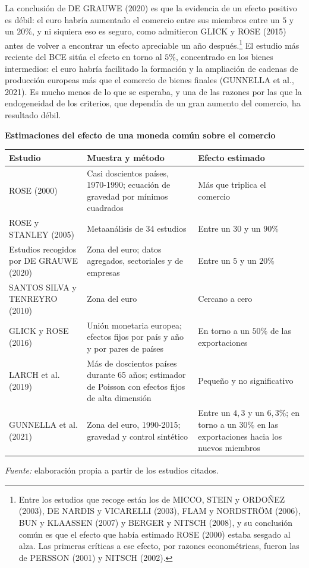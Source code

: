 \documentclass[10pt,a4paper]{article}
\begin{document}
La conclusión de DE GRAUWE (2020) es que la evidencia de un efecto positivo es débil: el euro habría aumentado el comercio entre sus miembros entre un $5$ y un $20\%$, y ni siquiera eso es seguro, como admitieron GLICK y ROSE (2015) antes de volver a encontrar un efecto apreciable un año después.\footnote{%
    Entre los estudios que recoge están los de MICCO, STEIN y ORDOÑEZ (2003), DE NARDIS y VICARELLI (2003), FLAM y NORDSTRÖM (2006), BUN y KLAASSEN (2007) y BERGER y NITSCH (2008), y su conclusión común es que el efecto que había estimado ROSE (2000) estaba sesgado al alza. Las primeras críticas a ese efecto, por razones econométricas, fueron las de PERSSON (2001) y NITSCH (2002).
} El estudio más reciente del BCE sitúa el efecto en torno al $5\%$, concentrado en los bienes intermedios: el euro habría facilitado la formación y la ampliación de cadenas de producción europeas más que el comercio de bienes finales (GUNNELLA et al., 2021). Es mucho menos de lo que se esperaba, y una de las razones por las que la endogeneidad de los criterios, que dependía de un gran aumento del comercio, ha resultado débil.

\begin{center}\begin{minipage}{\linewidth}\centering
{\small\textbf{Estimaciones del efecto de una moneda común sobre el comercio}}\par\vspace{0.3em}
{\footnotesize
\begin{tabular}{p{3.6cm}p{5.6cm}p{4.4cm}}
\hline
\textbf{Estudio} & \textbf{Muestra y método} & \textbf{Efecto estimado}\tabularnewline
\hline
ROSE (2000) & Casi doscientos países, 1970-1990; ecuación de gravedad por mínimos cuadrados & Más que triplica el comercio\tabularnewline
ROSE y STANLEY (2005) & Metaanálisis de 34 estudios & Entre un $30$ y un $90\%$\tabularnewline
\raggedright Estudios recogidos por DE GRAUWE (2020) & Zona del euro; datos agregados, sectoriales y de empresas & Entre un $5$ y un $20\%$\tabularnewline
SANTOS SILVA y TENREYRO (2010) & Zona del euro & Cercano a cero\tabularnewline
GLICK y ROSE (2016) & Unión monetaria europea; efectos fijos por país y año y por pares de países & En torno a un $50\%$ de las exportaciones\tabularnewline
LARCH et al. (2019) & Más de doscientos países durante 65 años; estimador de Poisson con efectos fijos de alta dimensión & Pequeño y no significativo\tabularnewline
GUNNELLA et al. (2021) & Zona del euro, 1990-2015; gravedad y control sintético & Entre un $4{,}3$ y un $6{,}3\%$; en torno a un $30\%$ en las exportaciones hacia los nuevos miembros\tabularnewline
\hline
\end{tabular}}\par\vspace{0.3em}
{\small\textit{Fuente: }elaboración propia a partir de los estudios citados.}
\end{minipage}\end{center}
\end{document}
